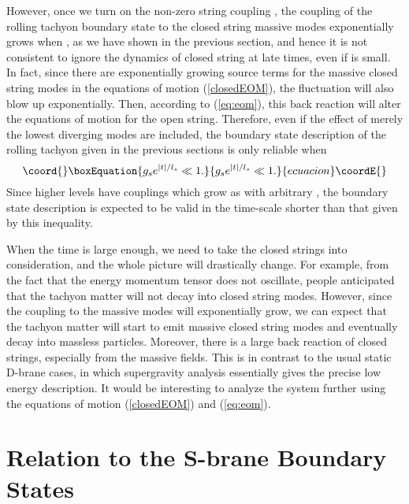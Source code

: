 \documentclass[a4paper,12pt]{article} \textheight=8.5truein
\providecommand{\ra}{\rightarrow}
\begin{document}
However, once we turn on the non-zero string coupling \coordHE{}, the
coupling of the rolling tachyon boundary state to the closed
string massive modes exponentially grows when \myHighlight{$x^0 \ra \infty$}\coordHE{}, as
we have shown in the previous section, and hence it is not
consistent to ignore the dynamics of closed string at late times,
even if \coordHE{} is small. In fact, since there are exponentially
growing source terms for the massive closed string modes in the
equations of motion (\ref{closedEOM}), the fluctuation will also
blow up exponentially. Then, according to (\ref{eq:eom}), this
back reaction will alter the equations of motion for the open
string. Therefore, even if the effect of merely the lowest diverging
modes are included, the boundary state description of the rolling
tachyon given in the previous sections is only reliable when
\begin{equation}\coord{}\boxEquation{
  \label{eq:validity}
  g_s e^{|t|/l_s} \ll 1.
}{
  g_s e^{|t|/l_s} \ll 1.
}{ecuacion}\coordE{}\end{equation}
Since higher levels have couplings which grow as \coordHE{} with
arbitrary \coordHE{}, the boundary state description is expected to be
valid in the time-scale shorter than that given by this
inequality.

When the time \coordHE{} is large enough, we need to take the closed
strings into consideration, and the whole picture will drastically
change. For example, from the fact that the energy momentum tensor
does not oscillate, people anticipated that the tachyon matter
will not decay into closed string modes. However, since the
coupling to the massive modes will exponentially grow, we can
expect that the tachyon matter will start to emit massive closed
string modes and eventually decay into massless particles.
Moreover, there is a large back reaction of closed strings,
especially from the massive fields. This is in contrast to the
usual static D-brane cases, in which supergravity analysis
essentially gives the precise low energy description. It would be
interesting to analyze the system further using the equations of
motion (\ref{closedEOM}) and (\ref{eq:eom}).



\section{Relation to the S-brane Boundary States} \label{s-brane}
\end{document}
